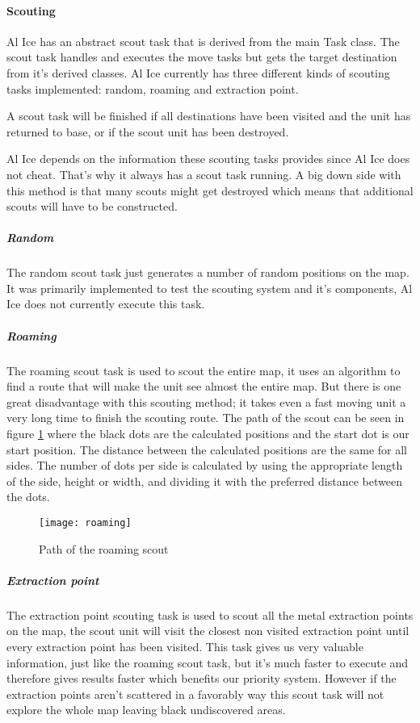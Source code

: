 \paragraph{Scouting}
\label{sec:scouting}
Al Ice has an abstract scout task that is derived from the main Task class.
The scout task handles and executes the move tasks but gets the target
destination from it's derived classes. Al Ice currently has three different
kinds of scouting tasks implemented: random, roaming and extraction point. 

A scout task will be finished if all destinations have been visited and the
unit has returned to base, or if the scout unit has been destroyed.

Al Ice depends on the information these scouting tasks provides since Al Ice
does not cheat. That's why it always has a scout task running. A big
down side with this method is that many scouts might get destroyed which means
that additional scouts will have to be constructed.

\subparagraph{Random}
The random scout task just generates a number of random positions on the
map. It was primarily implemented to test the scouting system and it's components,
Al Ice does not currently execute this task.

\subparagraph{Roaming}
The roaming scout task is used to scout the entire map, it uses an algorithm to
find a route that will make the unit see almost the entire map. But there is
one great disadvantage with this scouting method; it takes even a fast moving unit a very long time to finish the
scouting route. The path of the scout can be seen in figure \ref{fig:scout_roaming} where the black
dots are the calculated positions and the start dot is our start position. The distance between the
calculated positions are the same for all sides. The number of dots per side is calculated by using
the appropriate length of the side, height or width, and dividing it with the preferred distance
between the dots.

\begin{figure}[htb]
\caption{Path of the roaming scout}
\label{fig:scout_roaming}
\centering
\texttt{[image: roaming]} %
\end{figure}

\subparagraph{Extraction point} 
The extraction point scouting task is used to scout all the metal extraction
points on the map, the scout unit will visit the closest non visited extraction
point until every extraction point has been visited. This task gives us very
valuable information, just like the roaming scout task, but it's much faster to
execute and therefore gives results faster which benefits our priority system. However if the
extraction points aren't scattered in a favorably way this scout task will not explore the whole map
leaving black undiscovered areas.

